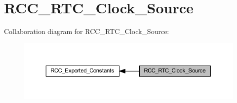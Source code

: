 \hypertarget{group___r_c_c___r_t_c___clock___source}{}\section{R\+C\+C\+\_\+\+R\+T\+C\+\_\+\+Clock\+\_\+\+Source}
\label{group___r_c_c___r_t_c___clock___source}
Collaboration diagram for R\+C\+C\+\_\+\+R\+T\+C\+\_\+\+Clock\+\_\+\+Source\+:
\nopagebreak
\begin{figure}[H]
\begin{center}
\leavevmode
\includegraphics[width=350pt]{group___r_c_c___r_t_c___clock___source}
\end{center}
\end{figure}
